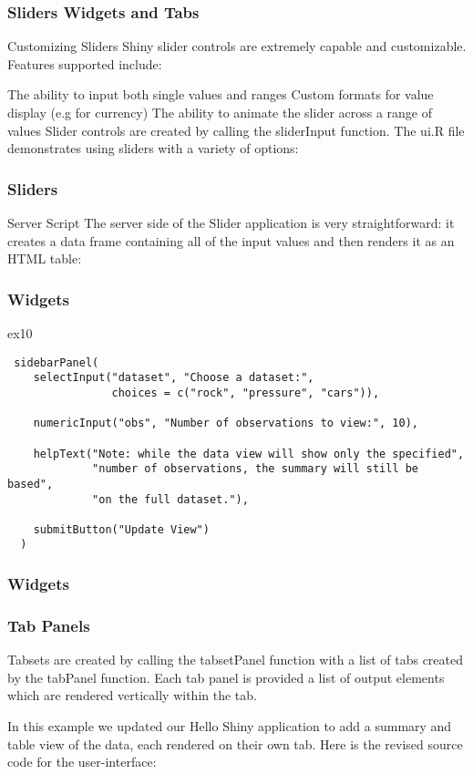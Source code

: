 \documentclass{beamer}
\begin{document}
\begin{frame}
\frametitle{Sliders Widgets and Tabs}
Customizing Sliders
Shiny slider controls are extremely capable and customizable. Features supported include:

The ability to input both single values and ranges
Custom formats for value display (e.g for currency)
The ability to animate the slider across a range of values
Slider controls are created by calling the sliderInput function. The ui.R file demonstrates using sliders with a variety of options:
\end{frame}
\begin{frame}
\frametitle{Sliders}
Server Script
The server side of the Slider application is very straightforward: it creates a data frame containing all of the input values and then renders it as an HTML table:
\end{frame}
\begin{frame}[fragile]
\frametitle{Widgets}
ex10
\begin{verbatim}
 sidebarPanel(
    selectInput("dataset", "Choose a dataset:", 
                choices = c("rock", "pressure", "cars")),

    numericInput("obs", "Number of observations to view:", 10),

    helpText("Note: while the data view will show only the specified",
             "number of observations, the summary will still be based",
             "on the full dataset."),

    submitButton("Update View")
  )
\end{verbatim}
\end{frame}
\begin{frame}
\frametitle{Widgets}

\end{frame}
\begin{frame}
\frametitle{Tab Panels}

Tabsets are created by calling the tabsetPanel function with a list of tabs created by the tabPanel function. Each tab panel is provided a list of output elements which are rendered vertically within the tab.

In this example we updated our Hello Shiny application to add a summary and table view of the data, each rendered on their own tab. Here is the revised source code for the user-interface:
\end{frame}
\end{document}
